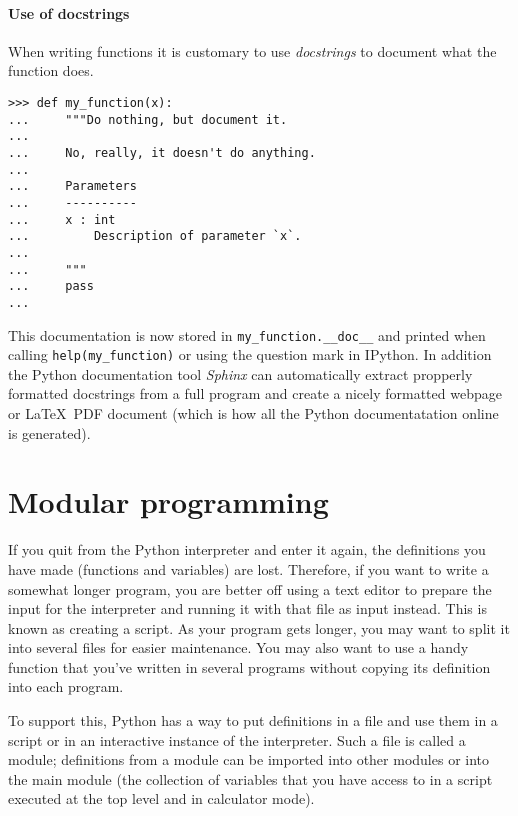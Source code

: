 \documentclass[10pt,a4paper]{article}
\begin{document}
\paragraph{Use of docstrings}
When writing functions it is customary to use \emph{docstrings} to document what the function does.
\begin{lstlisting}
>>> def my_function(x):
...     """Do nothing, but document it.
...
...     No, really, it doesn't do anything.
...
...     Parameters
...     ----------
...     x : int
...         Description of parameter `x`.
...
...     """
...     pass
...
\end{lstlisting}
This documentation is now stored in \verb|my_function.__doc__| and printed when calling \verb|help(my_function)| or using the question mark in IPython. In addition the Python documentation tool \emph{Sphinx} can automatically extract propperly formatted docstrings from a full program and create a nicely formatted webpage or \LaTeX\ PDF document (which is how all the Python documentatation online is generated).
\section{Modular programming}
If you quit from the Python interpreter and enter it again, the definitions you have made (functions and variables) are lost. Therefore, if you want to write a somewhat longer program, you are better off using a text editor to prepare the input for the interpreter and running it with that file as input instead. This is known as creating a script. As your program gets longer, you may want to split it into several files for easier maintenance. You may also want to use a handy function that you've written in several programs without copying its definition into each program.

To support this, Python has a way to put definitions in a file and use them in a script or in an interactive instance of the interpreter. Such a file is called a module; definitions from a module can be imported into other modules or into the main module (the collection of variables that you have access to in a script executed at the top level and in calculator mode).
\end{document}
